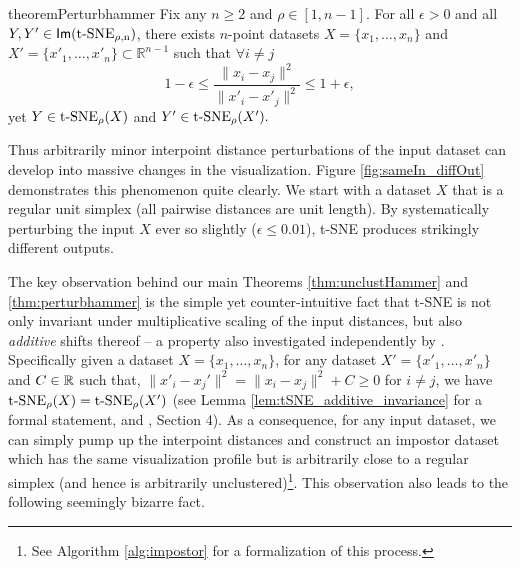 
\begin{restatable}{theorem}{Perturbhammer}
\label{thm:perturbhammer}
    Fix any $n \geq 2$ and $\rho \in [1, n-1]$. For all $\epsilon>0$ and all $Y, Y' \in {\operatorname*{\mathsf{Im}({\operatorname*{t-SNE}}_{\rho,n})}}$, there exists $n$-point datasets $X = \{x_1,\ldots,x_n \}$ and $ X'=\{x'_1,\ldots,x'_n\} \subset \mathbb{R}^{n-1}$ such that $\forall i\neq j$
    $$1 - \epsilon \leq \frac{\lVert x_i - x_j \rVert^2}{\lVert x'_i - x'_j \rVert^2} \leq 1 + \epsilon,$$
 yet $Y \in {\operatorname*{t-SNE}}_\rho(X)$ and 
    $Y' \in {\operatorname*{t-SNE}}_\rho(X').$
\end{restatable}
Thus arbitrarily minor interpoint distance perturbations of the input dataset can develop into massive changes in the visualization. Figure \ref{fig:sameIn_diffOut} demonstrates this phenomenon quite clearly. We start with a dataset $X$ that is a regular unit simplex (all pairwise distances are unit length). By systematically perturbing the input $X$ ever so slightly ($\epsilon\leq 0.01$), t-SNE produces strikingly different outputs. 

The key observation behind our main Theorems \ref{thm:unclustHammer} and \ref{thm:perturbhammer} is the simple yet counter-intuitive fact that t-SNE is not only invariant under multiplicative scaling of the input distances, but also \emph{additive} shifts thereof – a property also investigated independently by \citet{lee2011, lee2014}. Specifically given a dataset $X=\{x_1,\ldots,x_n\}$, for any dataset $X'=\{x'_1,\ldots,x'_n\}$ and $C \in \mathbb{R}$ such that, $ \lVert x'_i-x_j' \rVert^2 = \lVert x_i-x_j \rVert^2+C \geq 0$ for $i \neq j$, we have $\operatorname*{t-SNE}_\rho(X) = \operatorname*{t-SNE}_\rho(X')$ (see Lemma \ref{lem:tSNE_additive_invariance} for a formal statement, and \citet{lee2011}, Section 4). As a consequence, for any input dataset, we can simply pump up the interpoint distances and construct an impostor dataset which has the same visualization profile but is arbitrarily close to a regular simplex (and hence is arbitrarily unclustered)\footnote{See Algorithm \ref{alg:impostor} for a formalization of this process.}. %
This observation also leads to the following seemingly bizarre fact. %

